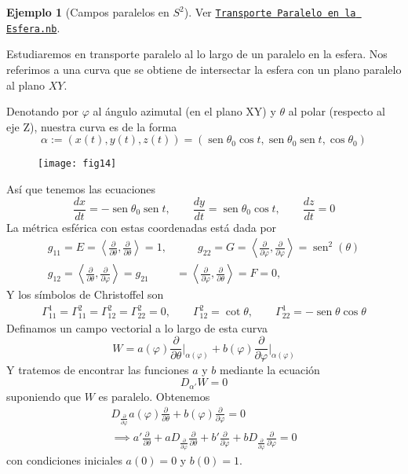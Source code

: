 \documentclass[spanish]{book}
\theoremstyle{definition}
\newtheorem*{ejem}{Ejemplo}
\DeclareMathOperator{\sen}{sen}
\begin{document}
	\begin{ejem}[Campos paralelos en $S^2$]
		
		
		Ver \href{https://github.com/dan-gc/geo-riem/blob/main/Transporte%20Paralelo%20en%20la%20Esfera.nb}{\texttt{Transporte Paralelo en la Esfera.nb}}.
		
		Estudiaremos en transporte paralelo al lo largo de un paralelo en la esfera. Nos referimos a una curva que se obtiene de intersectar la esfera con un plano paralelo al plano $XY$.
		
		Denotando por $\varphi$ al ángulo azimutal (en el plano XY) y $\theta$ al polar (respecto al eje Z), nuestra curva es de la forma
		\[\alpha:=(x(t),y(t),z(t))=(\sen\theta_0\cos t,\sen\theta_0\sen t,\cos\theta_0)\]
		\begin{figure}[H]
			\centering
			\texttt{[image: fig14]}
			\label{fig:fig14}
		\end{figure}
		
		Así que tenemos las ecuaciones
		\[\frac{dx}{dt}=-\sen\theta_0\sen t,\qquad\frac{dy}{dt}=\sen\theta_0\cos t,\qquad\frac{dz}{dt}=0\]
		La métrica esférica con estas coordenadas está dada por
		\begin{align*}
			g_{11}=E=\left\langle \frac{\partial}{\partial \theta},\frac{\partial}{\partial \theta}\right\rangle=1,&\qquad g_{22}=G=\left\langle \frac{\partial}{\partial \varphi},\frac{\partial}{\partial \varphi}\right\rangle=\sen^2(\theta)\\
			g_{12}=\left\langle \frac{\partial}{\partial \theta},\frac{\partial}{\partial \varphi}\right\rangle=g_{21}&=\left\langle \frac{\partial}{\partial \varphi},\frac{\partial}{\partial \theta}\right\rangle=F=0,
		\end{align*}
		Y los símbolos de Christoffel son
		\begin{align*}
			\Gamma_{11}^1=\Gamma^2_{11}=\Gamma^2_{12}=\Gamma_{22}^2=0,		\qquad \Gamma_{12}^2=\cot\theta,\qquad\Gamma^1_{22}=-\sen\theta\cos\theta
		\end{align*}
		Definamos un campo vectorial a lo largo de esta curva
		\[W=a(\varphi)\frac{\partial}{\partial\theta}\Big|_{\alpha(\varphi)}+b(\varphi)\frac{\partial}{\partial \varphi}\Big|_{\alpha(\varphi)}\]
		Y tratemos de encontrar las funciones $a$ y $b$ mediante la ecuación
		\[D_{\alpha'}W=0\]
		suponiendo que $W$ es paralelo. Obtenemos
		\begin{align*}
			D_{\frac{\partial}{\partial\varphi}}a(\varphi)\frac{\partial}{\partial\theta}+b(\varphi)\frac{\partial}{\partial\varphi}=0\\
			\implies a'\frac{\partial}{\partial\theta}+aD_{\frac{\partial}{\partial \varphi}}\frac{\partial}{\partial \theta}+b'\frac{\partial}{\partial\varphi}+bD_{\frac{\partial}{\partial \varphi}}\frac{\partial}{\partial\varphi}=0
		\end{align*}
		con condiciones iniciales $a(0)=0$ y $b(0)=1$.
		

\end{ejem}
\end{document}
